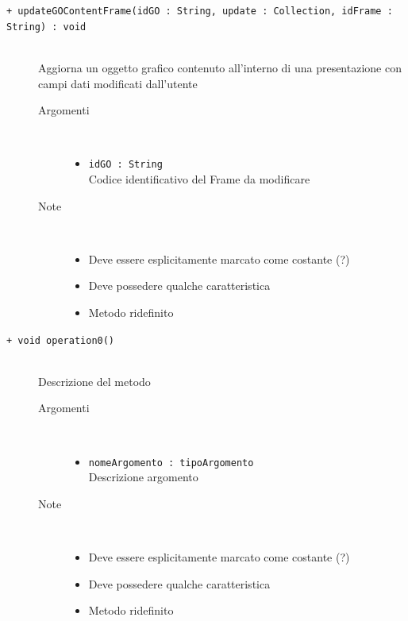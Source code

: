 \begin{description}
	\begin{description}
		\item[\texttt{+ updateGOContentFrame(idGO : String, update : Collection, idFrame : String) : void			}] \hfill \\
			Aggiorna un oggetto grafico contenuto all'interno di una presentazione con  campi dati modificati dall'utente
			
		\begin{description}
			\item[Argomenti] \hfill \\
				\begin{itemize}
				
					\item \texttt{idGO : String			} \hfill \\
					Codice identificativo del Frame da modificare
					
				\end{itemize}
			\item[Note] \hfill \\
			\begin{itemize}
					\item Deve essere esplicitamente marcato come costante (?)
					\item Deve possedere qualche caratteristica
					\item Metodo ridefinito
				\end{itemize}
		\end{description}
	\end{description}
	
	\begin{description}
		\item[\texttt{+ void operation0()			}] \hfill \\
			Descrizione del metodo
			
		\begin{description}
			\item[Argomenti] \hfill \\
				\begin{itemize}
				
					\item \texttt{nomeArgomento : tipoArgomento			} \hfill \\
					Descrizione argomento
					
				\end{itemize}
			\item[Note] \hfill \\
			\begin{itemize}
					\item Deve essere esplicitamente marcato come costante (?)
					\item Deve possedere qualche caratteristica
					\item Metodo ridefinito
				\end{itemize}
		\end{description}
	\end{description}
	
	
	
	
\end{description}